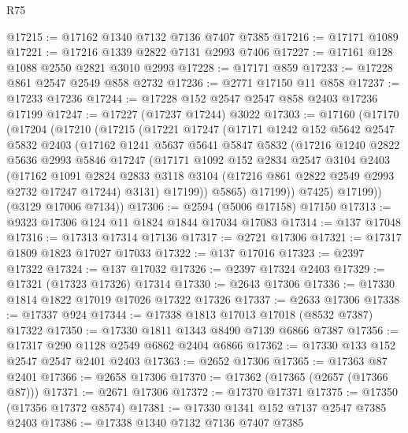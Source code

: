 \begin{lexlean}{R75}
\begin{coremodule}
@17215 := @17162 @1340 @7132 @7136 @7407 @7385
@17216 := @17171 @1089
@17221 := @17216 @1339 @2822 @7131 @2993 @7406
@17227 := @17161 @128 @1088 @2550 @2821 @3010 @2993
@17228 := @17171 @859
@17233 := @17228 @861 @2547 @2549 @858 @2732
@17236 := @2771 @17150 @11 @858
@17237 := @17233 @17236
@17244 := @17228 @152 @2547 @2547 @858 @2403 @17236 @17199
@17247 := @17227 (@17237 @17244) @3022
@17303 := @17160
    (@17170
      (@17204
        (@17210
          (@17215
            (@17221
              @17247
              (@17171
                @1242
                @152
                @5642
                @2547
                @5832
                @2403
                (@17162
                  @1241
                  @5637
                  @5641
                  @5847
                  @5832
                  (@17216
                    @1240
                    @2822
                    @5636
                    @2993
                    @5846
                    @17247
                    (@17171
                      @1092
                      @152
                      @2834
                      @2547
                      @3104
                      @2403
                      (@17162
                        @1091
                        @2824
                        @2833
                        @3118
                        @3104
                        (@17216 @861 @2822 @2549 @2993 @2732 @17247 @17244)
                        @3131)
                      @17199))
                  @5865)
                @17199))
            @7425)
          @17199))
      (@3129 @17006 @7134))
@17306 := @2594 (@5006 @17158) @17150
@17313 := @9323 @17306 @124 @11 @1824 @1844 @17034 @17083
@17314 := @137 @17048
@17316 := @17313 @17314 @17136
@17317 := @2721 @17306
@17321 := @17317 @1809 @1823 @17027 @17033
@17322 := @137 @17016
@17323 := @2397 @17322
@17324 := @137 @17032
@17326 := @2397 @17324 @2403
@17329 := @17321 (@17323 @17326) @17314
@17330 := @2643 @17306
@17336 := @17330 @1814 @1822 @17019 @17026 @17322 @17326
@17337 := @2633 @17306
@17338 := @17337 @924
@17344 := @17338 @1813 @17013 @17018 (@8532 @7387) @17322
@17350 := @17330 @1811 @1343 @8490 @7139 @6866 @7387
@17356 := @17317 @290 @1128 @2549 @6862 @2404 @6866
@17362 := @17330 @133 @152 @2547 @2547 @2401 @2403
@17363 := @2652 @17306
@17365 := @17363 @87 @2401
@17366 := @2658 @17306
@17370 := @17362 (@17365 (@2657 (@17366 @87)))
@17371 := @2671 @17306
@17372 := @17370 @17371
@17375 := @17350 (@17356 @17372 @8574)
@17381 := @17330 @1341 @152 @7137 @2547 @7385 @2403
@17386 := @17338 @1340 @7132 @7136 @7407 @7385

\end{coremodule}
\end{lexlean}
